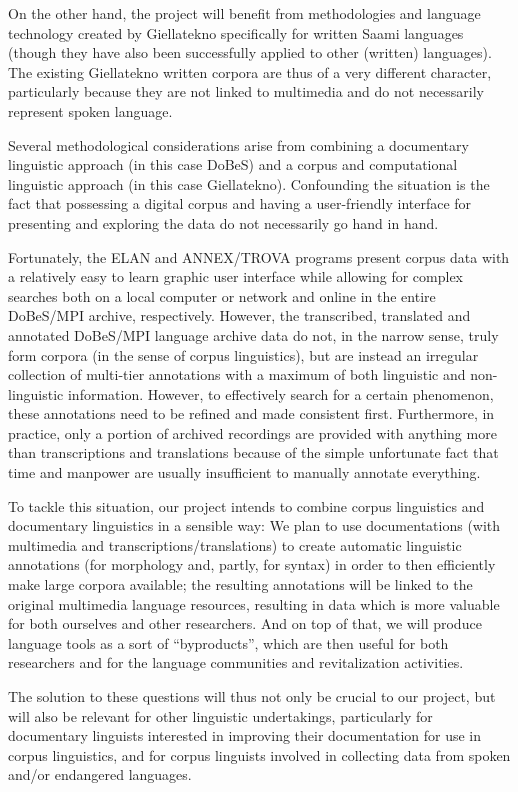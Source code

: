 \documentclass[a4paper,12pt]{article}
\begin{document}
On the other hand, the project will benefit from methodologies and language technology created by Giellatekno specifically for written Saami languages (though they have also been successfully applied to other (written) languages). The existing Giellatekno written corpora are thus of a very different character, particularly because they are not linked to multimedia and do not necessarily represent spoken language.

Several methodological considerations arise from combining a documentary linguistic approach (in this case DoBeS) and a corpus and computational linguistic approach (in this case Giellatekno). Confounding the situation is the fact that possessing a digital corpus and having a user-friendly interface for presenting and exploring the data do not necessarily go hand in hand. 

Fortunately, the ELAN and ANNEX/TROVA programs present corpus data with a relatively easy to learn graphic user interface while allowing for complex searches both on a local computer or network and online in the entire DoBeS/MPI archive, respectively. However, the transcribed, translated and annotated DoBeS/MPI language archive data do not, in the narrow sense, truly form corpora (in the sense of corpus linguistics), but are instead an irregular collection of multi-tier annotations with a maximum of both linguistic and non-linguistic information. However, to effectively search for a certain phenomenon, these annotations need to be refined and made consistent first. Furthermore, in practice, only a portion of archived recordings are provided with anything more than transcriptions and translations because of the simple unfortunate fact that time and manpower are usually insufficient to manually annotate everything.

To tackle this situation, our project intends to combine corpus linguistics and documentary linguistics in a sensible way: We plan to use documentations (with multimedia and transcriptions/translations) to create automatic linguistic annotations (for morphology and, partly, for syntax) in order to then efficiently make large corpora available; the resulting annotations will be linked to the original multimedia language resources, resulting in data which is more valuable for both ourselves and other researchers. And on top of that, we will produce language tools as a sort of “byproducts”, which are then useful for both researchers and for the language communities and revitalization activities.

The solution to these questions will thus not only be crucial to our project, but will also be relevant for other linguistic undertakings, particularly for documentary linguists interested in improving their documentation for use in corpus linguistics, and for corpus linguists involved in collecting data from spoken and/or endangered languages.
\end{document}
